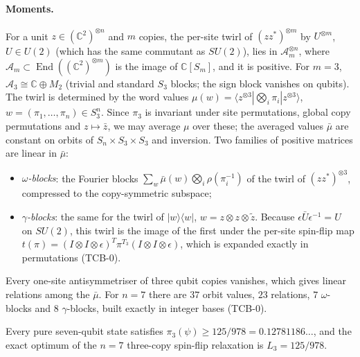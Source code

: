 \paragraph{Moments.} For a unit $z\in(\mathbb C^2)^{\otimes n}$ and $m$ copies, the per-site
twirl of $(zz^*)^{\otimes m}$ by $U^{\otimes m}$, $U\in U(2)$ (which has the same commutant as $SU(2)$), lies in $\mathcal A_m^{\otimes n}$, where
$\mathcal A_m\subset\operatorname{End}((\mathbb C^2)^{\otimes m})$ is the image of
$\mathbb C[S_m]$, and it is positive. For $m=3$, $\mathcal A_3\cong\mathbb C\oplus M_2$ (trivial and
standard $S_3$ blocks; the sign block vanishes on qubits). The twirl is determined by the word values
$\mu(w)=\langle z^{\otimes3}|\bigotimes_i\pi_i|z^{\otimes3}\rangle$, $w=(\pi_1,\dots,\pi_n)\in S_3^n$.
Since $\pi_3$ is invariant under site permutations, global copy permutations and $z\mapsto\bar z$, we
may average $\mu$ over these; the averaged values $\bar\mu$ are constant on orbits of $S_n\times
S_3\times S_3$ and inversion. Two families of positive matrices are linear in $\bar\mu$:
\begin{itemize}
  \item \emph{$\omega$-blocks}: the Fourier blocks $\sum_w\bar\mu(w)\bigotimes_i\rho(\pi_i^{-1})$ of
    the twirl of $(zz^*)^{\otimes3}$, compressed to the copy-symmetric subspace;
  \item \emph{$\gamma$-blocks}: the same for the twirl of $|w\rangle\langle w|$,
    $w=z\otimes z\otimes\tilde z$. Because $\epsilon\bar U\epsilon^{-1}=U$ on $SU(2)$, this twirl is the
    image of the first under the per-site spin-flip map
    $t(\pi)=(I\otimes I\otimes\epsilon)^T\pi^{T_3}(I\otimes I\otimes\epsilon)$, which is expanded exactly
    in permutations (TCB-0).
\end{itemize}
Every one-site antisymmetriser of three qubit copies vanishes, which gives linear relations among the
$\bar\mu$. For $n=7$ there are $37$ orbit values, $23$ relations, $7$ $\omega$-blocks and $8$
$\gamma$-blocks, built exactly in integer bases (TCB-0).

\begin{theorem}\label{thm:threecopy}
Every pure seven-qubit state satisfies $\pi_3(\psi)\ge 125/978 = 0.12781186\ldots$,
and the exact optimum of the $n=7$ three-copy spin-flip relaxation is $L_3 = 125/978$.
\end{theorem}

